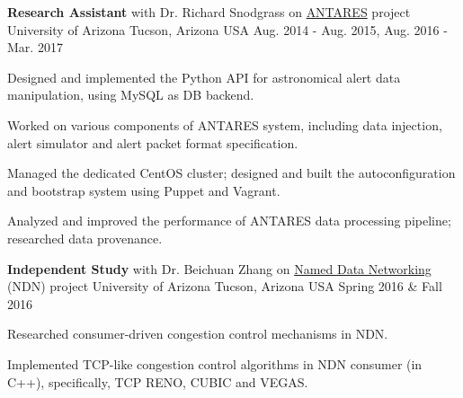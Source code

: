 

\begin{cventries}

  \cventry
    {\textbf{Research Assistant} with Dr. Richard Snodgrass on \href{https://www.noao.edu/ANTARES/}{ANTARES} project} %
    {University of Arizona} %
    {Tucson, Arizona USA} %
    {Aug. 2014 - Aug. 2015, Aug. 2016 - Mar. 2017} %
    {
      \begin{cvitems} %
      \item {Designed and implemented the Python API for astronomical
    alert data manipulation, using MySQL as DB backend.}
      \item {Worked on various components of ANTARES system,
    including data injection, alert simulator and alert packet format specification.}
        \item {Managed the dedicated CentOS cluster; designed and
    built the autoconfiguration and bootstrap 
    system using Puppet and Vagrant.}
        \item {Analyzed and improved the performance of ANTARES data
    processing pipeline; researched data provenance.}
      \end{cvitems}
    }

  \cventry
    {\textbf{Independent Study} with Dr. Beichuan Zhang
    on \href{https://named-data.net/}{Named Data Networking} (NDN) project} %
    {University of Arizona} %
    {Tucson, Arizona USA} %
    {Spring 2016 \& Fall 2016} %
    {
      \begin{cvitems} %
        \item {Researched consumer-driven congestion control mechanisms in
    NDN.}
        \item {Implemented TCP-like congestion control algorithms in NDN
    consumer (in C++), specifically, TCP RENO, CUBIC and VEGAS.}
      \end{cvitems}
    }



\end{cventries}
